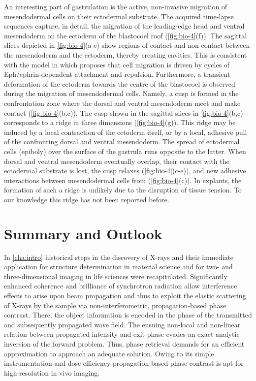 \documentclass[
twoside,
openright,
titlepage,
numbers=noenddot,
headinclude,
fleqn,
a4paper,
footinclude=true,
cleardoublepage=empty,
abstractoff,
BCOR=5mm,
paper=a4,
fontsize=11pt,
british,ngerman,american,
]{scrreprt}
\begin{document}
An interesting part of gastrulation is the active, non-invasive
migration of mesendodermal cells on their ectodermal substrate.  The
acquired time-lapse sequences capture, in detail, the migration of the
leading-edge head and ventral mesendoderm on the ectoderm of the
blastocoel roof (\cref{fig:bio-4}(f)).  The sagittal slices depicted
in \cref{fig:bio-4}(a-e) show regions of contact and non-contact
between the mesendoderm and the ectoderm, thereby creating cavities.
This is consistent with the model in \cite{Rohani2011} which proposes
that cell migration is driven by cycles of Eph/ephrin-dependent
attachment and repulsion.  Furthermore, a transient deformation of the
ectoderm towards the centre of the blastocoel is observed during the
migration of mesendodermal cells.  Namely, a cusp is formed in the
confrontation zone where the dorsal and ventral mesendoderm meet and
make contact (\cref{fig:bio-4}(b,c)).  The cusp shown in the sagittal
slices in \cref{fig:bio-4}(b,c) corresponds to a ridge in three
dimensions (\cref{fig:bio-4}(g)).  This ridge may be induced by a
local contraction of the ectoderm itself, or by a local, adhesive pull
of the confronting dorsal and ventral mesendoderm.  The spread of
ectodermal cells (epiboly) over the surface of the gastrula runs
opposite to the latter.  When dorsal and ventral mesendoderm
eventually overlap, their contact with the ectodermal substrate is
lost, the cusp relaxes (\cref{fig:bio-4}(c-e)), and new adhesive
interactions between mesendodermal cells from (\cref{fig:bio-4}(c)).
In explants, the formation of such a ridge is unlikely due to the
disruption of tissue tension.  To our knowledge this ridge has not
been reported before.


\chapter{Summary  and Outlook}
\label{cha:summary}

In \cref{cha:intro} historical steps in the discovery of X-rays and
their immediate application for structure determination in material
science and for two- and three-dimensional imaging in life sciences
were recapitulated.  Significantly enhanced coherence and brilliance
of synchrotron radiation allow interference effects to arise upon beam
propagation and thus to exploit the elastic scattering of X-rays by
the sample via non-interferometric, propagation-based phase contrast.
There, the object information is encoded in the phase of the
transmitted and subsequently propagated wave field.  The ensuing
non-local and non-linear relation between propagated intensity and
exit phase evades an exact analytic inversion of the forward problem.
Thus, phase retrieval demands for an efficient approximation to
approach an adequate solution.  Owing to its simple instrumentation
and dose efficiency propagation-based phase contrast is apt for
high-resolution in vivo imaging.
\end{document}
